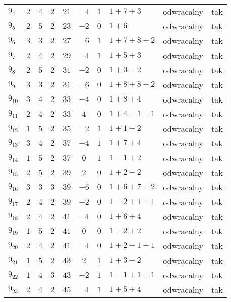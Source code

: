 \begin{longtable}{lccccccllc}
$9_{4}$    & $2$   & $4$ & $2$ & $21$  & $-4$ & $1$ & $1+7+3$       & odwracalny & tak \\
$9_{5}$    & $2$   & $5$ & $2$ & $23$  & $-2$ & $0$ & $1+6$         & odwracalny & tak \\
$9_{6}$    & $3$   & $3$ & $2$ & $27$  & $-6$ & $1$ & $1+7+8+2$     & odwracalny & tak \\
$9_{7}$    & $2$   & $4$ & $2$ & $29$  & $-4$ & $1$ & $1+5+3$       & odwracalny & tak \\
$9_{8}$    & $2$   & $5$ & $2$ & $31$  & $-2$ & $0$ & $1+0-2$       & odwracalny & tak \\
$9_{9}$    & $3$   & $3$ & $2$ & $31$  & $-6$ & $0$ & $1+8+8+2$     & odwracalny & tak \\
$9_{10}$   & $3$   & $4$ & $2$ & $33$  & $-4$ & $0$ & $1+8+4$       & odwracalny & tak \\
$9_{11}$   & $2$   & $4$ & $2$ & $33$  & $4$  & $0$ & $1+4-1-1$     & odwracalny & tak \\
$9_{12}$   & $1$   & $5$ & $2$ & $35$  & $-2$ & $1$ & $1+1-2$       & odwracalny & tak \\
$9_{13}$   & $3$   & $4$ & $2$ & $37$  & $-4$ & $1$ & $1+7+4$       & odwracalny & tak \\
$9_{14}$   & $1$   & $5$ & $2$ & $37$  & $0$  & $1$ & $1-1+2$       & odwracalny & tak \\
$9_{15}$   & $2$   & $5$ & $2$ & $39$  & $2$  & $0$ & $1+2-2$       & odwracalny & tak \\
$9_{16}$   & $3$   & $3$ & $3$ & $39$  & $-6$ & $0$ & $1+6+7+2$     & odwracalny & tak \\
$9_{17}$   & $2$   & $4$ & $2$ & $39$  & $-2$ & $0$ & $1-2+1+1$     & odwracalny & tak \\
$9_{18}$   & $2$   & $4$ & $2$ & $41$  & $-4$ & $0$ & $1+6+4$       & odwracalny & tak \\
$9_{19}$   & $1$   & $5$ & $2$ & $41$  & $0$  & $0$ & $1-2+2$       & odwracalny & tak \\
$9_{20}$   & $2$   & $4$ & $2$ & $41$  & $-4$ & $0$ & $1+2-1-1$     & odwracalny & tak \\
$9_{21}$   & $1$   & $5$ & $2$ & $43$  & $2$  & $1$ & $1+3-2$       & odwracalny & tak \\
$9_{22}$   & $1$   & $4$ & $3$ & $43$  & $-2$ & $1$ & $1-1+1+1$     & odwracalny & tak \\
$9_{23}$   & $2$   & $4$ & $2$ & $45$  & $-4$ & $1$ & $1+5+4$       & odwracalny & tak \\

\end{longtable}
